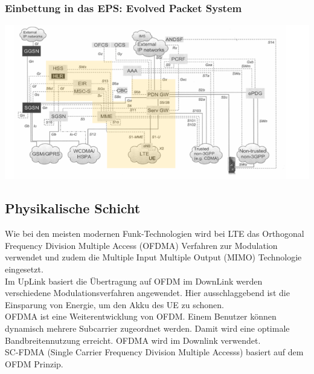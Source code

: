 \subsubsection{Einbettung in das EPS: Evolved Packet System}
\includegraphics[width = 0.75 \linewidth]{./Pics/LTE8.png}
\subsection{Physikalische Schicht}
Wie bei den meisten modernen Funk-Technologien wird bei LTE das Orthogonal Frequency Division Multiple Access (OFDMA) Verfahren zur Modulation verwendet und zudem die Multiple Input Multiple Output (MIMO) Technologie eingesetzt. \\
Im UpLink basiert die Übertragung auf OFDM im DownLink werden verschiedene Modulationsverfahren angewendet. Hier ausschlaggebend ist die Einsparung von Energie, um den Akku des UE zu schonen. \\
OFDMA ist eine Weiterentwicklung von OFDM. Einem Benutzer können dynamisch mehrere Subcarrier zugeordnet werden. Damit wird eine optimale Bandbreitennutzung erreicht. OFDMA wird im Downlink verwendet. \\
SC-FDMA (Single Carrier Frequency Division Multiple Accesss) basiert auf dem OFDM Prinzip. 